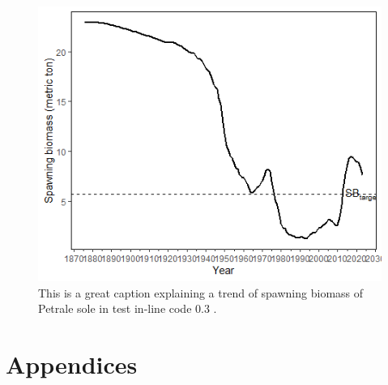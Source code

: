\documentclass[
]{scrartcl}
\begin{document}
\begin{figure}[H]

{\centering \includegraphics{SAR_USWC_Petrale_sole_skeleton_files/figure-docx/spawn_bio-1.png}

}

\caption{This is a great caption explaining a trend of spawning biomass
of Petrale sole in test in-line code 0.3 .}

\end{figure}%

\newpage{}

\section{Appendices}\label{appendices}
\end{document}
